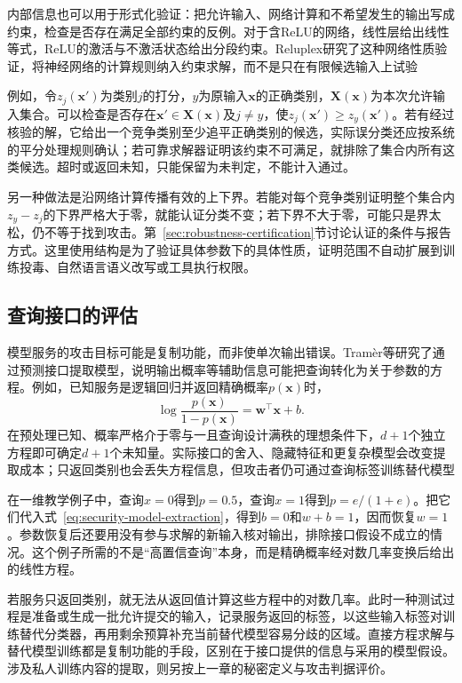 内部信息也可以用于形式化验证：把允许输入、网络计算和不希望发生的输出写成约束，检查是否存在满足全部约束的反例。对于含ReLU的网络，线性层给出线性等式，ReLU的激活与不激活状态给出分段约束。Reluplex研究了这种网络性质验证，将神经网络的计算规则纳入约束求解，而不是只在有限候选输入上试验

例如，令$z_j(\bm{x}')$为类别$j$的打分，$y$为原输入$\bm{x}$的正确类别，$\bm X(\bm{x})$为本次允许输入集合。可以检查是否存在$\bm{x}'\in\bm X(\bm{x})$及$j\ne y$，使$z_j(\bm{x}')\geq z_y(\bm{x}')$。若有经过核验的解，它给出一个竞争类别至少追平正确类别的候选，实际误分类还应按系统的平分处理规则确认；若可靠求解器证明该约束不可满足，就排除了集合内所有这类候选。超时或返回未知，只能保留为未判定，不能计入通过。

另一种做法是沿网络计算传播有效的上下界。若能对每个竞争类别证明整个集合内$z_y-z_j$的下界严格大于零，就能认证分类不变；若下界不大于零，可能只是界太松，仍不等于找到攻击。第~\ref{sec:robustness-certification}节讨论认证的条件与报告方式。这里使用结构是为了验证具体参数下的具体性质，证明范围不自动扩展到训练投毒、自然语言语义改写或工具执行权限。

\subsection{查询接口的评估}
\label{sec:security-information-test}

模型服务的攻击目标可能是复制功能，而非使单次输出错误。Tramèr等研究了通过预测接口提取模型，说明输出概率等辅助信息可能把查询转化为关于参数的方程。例如，已知服务是逻辑回归并返回精确概率$p(\bm{x})$时，
\begin{equation}
 \log\frac{p(\bm{x})}{1-p(\bm{x})}
 =\bm{w}^{\top}\bm{x}+b.
 \label{eq:security-model-extraction}
\end{equation}
在预处理已知、概率严格介于零与一且查询设计满秩的理想条件下，$d+1$个独立方程即可确定$d+1$个未知量。实际接口的舍入、隐藏特征和更复杂模型会改变提取成本；只返回类别也会丢失方程信息，但攻击者仍可通过查询标签训练替代模型

在一维教学例子中，查询$x=0$得到$p=0.5$，查询$x=1$得到$p=e/(1+e)$。把它们代入式~\eqref{eq:security-model-extraction}，得到$b=0$和$w+b=1$，因而恢复$w=1$。参数恢复后还要用没有参与求解的新输入核对输出，排除接口假设不成立的情况。这个例子所需的不是“高置信查询”本身，而是精确概率经对数几率变换后给出的线性方程。

若服务只返回类别，就无法从返回值计算这些方程中的对数几率。此时一种测试过程是准备或生成一批允许提交的输入，记录服务返回的标签，以这些输入标签对训练替代分类器，再用剩余预算补充当前替代模型容易分歧的区域。直接方程求解与替代模型训练都是复制功能的手段，区别在于接口提供的信息与采用的模型假设。涉及私人训练内容的提取，则另按上一章的秘密定义与攻击判据评价。

